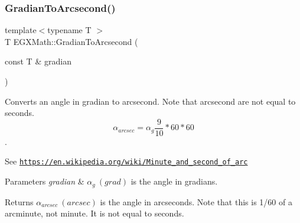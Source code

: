 \subsubsection{\texorpdfstring{Gradian\+To\+Arcsecond()}{GradianToArcsecond()}}
{\footnotesize\ttfamily template$<$typename T $>$ \\
T E\+G\+X\+Math\+::\+Gradian\+To\+Arcsecond (\begin{DoxyParamCaption}\item[{const T \&}]{gradian }\end{DoxyParamCaption})}



Converts an angle in gradian to arcsecond. Note that arcsecond are not equal to seconds. \[\alpha_{arcsec}=\alpha_{g}\frac{9}{10} * 60 * 60\]. 

See \href{https://en.wikipedia.org/wiki/Minute_and_second_of_arc}{\tt https\+://en.\+wikipedia.\+org/wiki/\+Minute\+\_\+and\+\_\+second\+\_\+of\+\_\+arc} 
\begin{DoxyParams}{Parameters}
{\em gradian} & $\alpha_{g}\ (grad)$ is the angle in gradians. \\
\hline
\end{DoxyParams}
\begin{DoxyReturn}{Returns}
$\alpha_{arcsec}\ (arcsec)$ is the angle in arcseconds. Note that this is 1/60 of a arcminute, not minute. It is not equal to seconds. 
\end{DoxyReturn}
